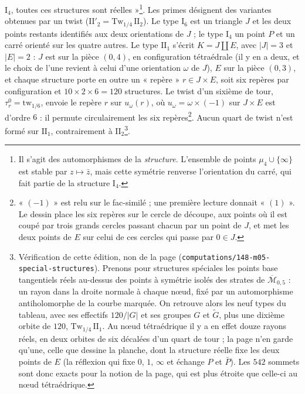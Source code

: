 \documentclass[11pt,a4paper]{article}
\begin{document}
$\mathrm{I}_4$, toutes ces structures sont réelles »\footnote{Il s'agit des
automorphismes de la \emph{structure}. L'ensemble de points $\mu_4 \cup
\{\infty\}$ est stable par $z \mapsto \bar z$, mais cette symétrie renverse
l'orientation du carré, qui fait partie de la structure $\mathrm{I}_4$.}. Les
primes désignent des variantes obtenues par un twist ($\mathrm{II}'_2 =
\mathrm{Tw}_{1/4}\,\mathrm{II}_2$). Le type $\mathrm{I}_6$ est un triangle $J$
et les deux points restants identifiés aux deux orientations de $J$ ; le type
$\mathrm{I}_4$ un point $P$ et un carré orienté sur les quatre autres. Le type
$\mathrm{II}_1$ s'écrit $K = J \amalg E$, avec $|J| = 3$ et $|E| = 2$ : $J$ est
sur la pièce $(0,4)$, en configuration tétraédrale (il y en a deux, et le choix de l'une revient à
celui d'une orientation $\omega$ de $J$), $E$ sur la pièce $(0,3)$, et chaque structure porte en
outre un « repère » $r \in J \times E$, soit six repères par configuration et
$10 \times 2 \times 6 = 120$ structures. Le twist d'un sixième de tour,
$\tau^{0}_{r} = \mathrm{tw}_{1/6}$, envoie le repère $r$ sur $u_{\omega}(r)$, où
$u_{\omega} = \omega \times (-1)$ sur $J \times E$ est d'ordre $6$ : il permute
circulairement les six repères\footnote{« $(-1)$ » est relu sur le fac-similé ;
une première lecture donnait « $(1)$ ». Le dessin place les six repères sur le
cercle de découpe, aux points où il est coupé par trois grands cercles passant
chacun par un point de $J$, et met les deux points de $E$ sur celui de ces cercles
qui passe par $0 \in J$.}. Aucun quart de twist n'est formé sur $\mathrm{II}_1$,
contrairement à $\mathrm{II}_2$\footnote{Vérification de cette édition, non de la
page (\texttt{computations/148-m05-special-structures}). Prenons pour structures
spéciales les points base tangentiels réels au-dessus des points à symétrie isolés
des strates de $\overline{\mathcal{M}}_{0,5}$ : un rayon dans la droite normale
à chaque nœud, fixé par un automorphisme antiholomorphe de la courbe marquée. On
retrouve alors les neuf types du tableau, avec ses effectifs $120/|G|$ et ses
groupes $G$ et $\widetilde{G}$, plus une dixième orbite de $120$,
$\mathrm{Tw}_{1/4}\,\mathrm{II}_1$. Au nœud tétraédrique il y a en effet douze
rayons réels, en deux orbites de six décalées d'un quart de tour ; la page n'en
garde qu'une, celle que dessine la planche, dont la structure réelle fixe les deux
points de $E$ (la réflexion qui fixe $0$, $1$, $\infty$ et échange $P$ et
$\bar P$). Les $542$ sommets sont donc exacts pour la notion de la page, qui
est plus étroite que celle-ci au nœud tétraédrique.}.
\end{document}
